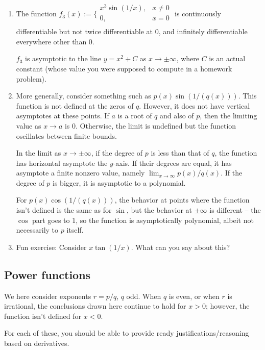 \documentclass[10pt]{amsart}
\begin{document}
\begin{enumerate}
\item The function $f_3(x) := \lbrace \begin{array}{rl} x^3\sin(1/x),
  & x \ne 0 \\ 0, & x = 0 \\\end{array}$ is continuously
  differentiable but not twice differentiable at $0$, and infinitely
  differentiable everywhere other than $0$.

  $f_3$ is asymptotic to the line $y = x^2 + C$ as $x \to \pm \infty$,
  where $C$ is an actual constant (whose value you were supposed to
  compute in a homework problem).

\item More generally, consider something such as $p(x)
  \sin(1/(q(x)))$. This function is not defined at the zeros of
  $q$. However, it does not have vertical asymptotes at these
  points. If $a$ is a root of $q$ and also of $p$, then the limiting
  value as $x \to a$ is $0$. Otherwise, the limit is undefined but the
  function oscillates between finite bounds.

  In the limit as $x \to \pm \infty$, if the degree of $p$ is less
  than that of $q$, the function has horizontal asymptote the
  $y$-axis. If their degrees are equal, it has asymptote a finite
  nonzero value, namely $\lim_{x \to \infty} p(x)/q(x)$. If the degree
  of $p$ is bigger, it is asymptotic to a polynomial.

  For $p(x)\cos(1/(q(x)))$, the behavior at points where the function
  isn't defined is the same as for $\sin$, but the behavior at $\pm
  \infty$ is different -- the $\cos$ part goes to $1$, so the function
  is asymptotically polynomial, albeit not necessarily to $p$ itself.
\item Fun exercise: Consider $x\tan(1/x)$. What can you say about this?
\end{enumerate}

\subsection{Power functions}

We here consider exponents $r = p/q$, $q$ odd. When $q$ is even, or
when $r$ is irrational, the conclusions drawn here continue to hold
for $x > 0$; however, the function isn't defined for $x < 0$.

For each of these, you should be able to provide ready
justifications/reasoning based on derivatives.
\end{document}

